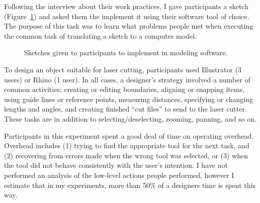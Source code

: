 \documentclass[11pt]{article}
\begin{document}
Following the interview about their work practices, I gave
participants a sketch (Figure~\ref{fig:interview-sketch}) and asked
them the implement it using their software tool of choice. The purpose
of this task was to learn what problems people met when executing the
common task of translating a sketch to a computer model.

\begin{figure}[h]
\centering 
{}
\hspace{1cm} 
\caption{Sketches given to participants to implement in modeling software.}
\label{fig:interview-sketch}
\end{figure}

To design an object suitable for laser cutting, participants used
Illustrator (3 users) or Rhino (1 user). In all cases, a designer's
strategy involved a number of common activities: creating or editing
boundaries, aligning or snapping items, using guide lines or reference
points, measuring distances, specifying or changing lengths and
angles, and creating finished ``cut files'' to send to the laser
cutter. These tasks are in addition to selecting/deselecting, zooming,
panning, and so on.

Participants in this experiment spent a good deal of time on operating
overhead. Overhead includes (1) trying to find the appropriate tool
for the next task, and (2) recovering from errors made when the wrong
tool was selected, or (3) when the tool did not behave consistently
with the user's intention. I have not performed an analysis of the
low-level actions people performed, however I estimate that in my
experiments, more than 50\% of a designers time is spent this way.
\end{document}
